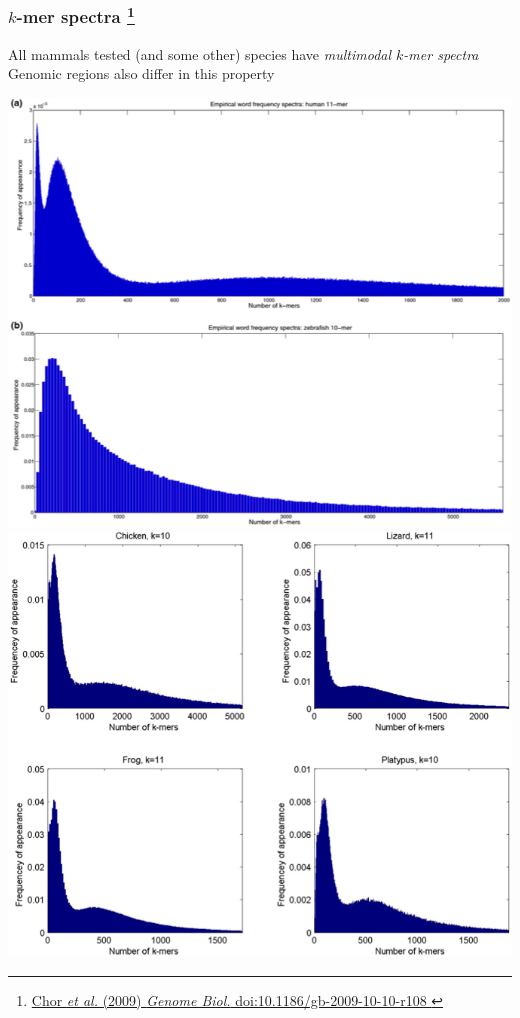%
\begin{frame}
  \frametitle{$k$-mer spectra
  \footnote{\tiny{\href{http://dx.doi.org/10.1186/gb-2009-10-10-r108
}{Chor \textit{et al.} (2009) \textit{Genome Biol.} doi:10.1186/gb-2009-10-10-r108
}}}
  }
  \textcolor{RawSienna}{All mammals tested (and some other) species have \textit{multimodal $k$-mer spectra}} \\
  Genomic regions also differ in this property
  \begin{center}
    \includegraphics[height=0.4\textheight]{images/kmer_mammal1}
    \includegraphics[height=0.4\textheight]{images/kmer_mammal2}    
  \end{center}  
\end{frame}
